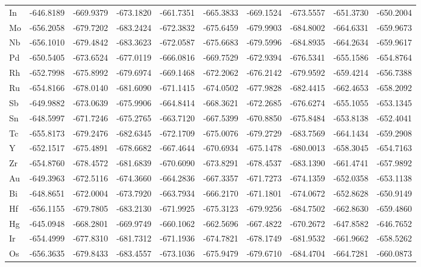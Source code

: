 \begin{table}[h]
{\begin{tabular}{*{10}{l}}
    In & -646.8189 & -669.9379 & -673.1820 & -661.7351 & -665.3833 & -669.1524 & -673.5557 & -651.3730 & -650.2004 \\
    Mo & -656.2058 & -679.7202 & -683.2424 & -672.3832 & -675.6459 & -679.9903 & -684.8002 & -664.6331 & -659.9673 \\
    Nb & -656.1010 & -679.4842 & -683.3623 & -672.0587 & -675.6683 & -679.5996 & -684.8935 & -664.2634 & -659.9617 \\
    Pd & -650.5405 & -673.6524 & -677.0119 & -666.0816 & -669.7529 & -672.9394 & -676.5341 & -655.1586 & -654.8764 \\
    Rh & -652.7998 & -675.8992 & -679.6974 & -669.1468 & -672.2062 & -676.2142 & -679.9592 & -659.4214 & -656.7388 \\
    Ru & -654.8166 & -678.0140 & -681.6090 & -671.1415 & -674.0502 & -677.9828 & -682.4415 & -662.4653 & -658.2092 \\
    Sb & -649.9882 & -673.0639 & -675.9906 & -664.8414 & -668.3621 & -672.2685 & -676.6274 & -655.1055 & -653.1345 \\
    Sn & -648.5997 & -671.7246 & -675.2765 & -663.7120 & -667.5399 & -670.8850 & -675.8484 & -653.8138 & -652.4041 \\
    Tc & -655.8173 & -679.2476 & -682.6345 & -672.1709 & -675.0076 & -679.2729 & -683.7569 & -664.1434 & -659.2908 \\
    Y  & -652.1517 & -675.4891 & -678.6682 & -667.4644 & -670.6934 & -675.1478 & -680.0013 & -658.3045 & -654.7163 \\
    Zr & -654.8760 & -678.4572 & -681.6839 & -670.6090 & -673.8291 & -678.4537 & -683.1390 & -661.4741 & -657.9892 \\
    Au & -649.3963 & -672.5116 & -674.3660 & -664.2836 & -667.3357 & -671.7273 & -674.1359 & -652.0358 & -653.1138 \\
    Bi & -648.8651 & -672.0004 & -673.7920 & -663.7934 & -666.2170 & -671.1801 & -674.0672 & -652.8628 & -650.9149 \\
    Hf & -656.1155 & -679.7805 & -683.2130 & -671.9925 & -675.3123 & -679.9256 & -684.7502 & -662.8630 & -659.4860 \\
    Hg & -645.0948 & -668.2801 & -669.9749 & -660.1062 & -662.5696 & -667.4822 & -670.2672 & -647.8582 & -646.7652 \\
    Ir & -654.4999 & -677.8310 & -681.7312 & -671.1936 & -674.7821 & -678.1749 & -681.9532 & -661.9662 & -658.5262 \\
    Os & -656.3635 & -679.8433 & -683.4557 & -673.1036 & -675.9479 & -679.6710 & -684.4704 & -664.7281 & -660.0873 \\

\end{tabular}}
\end{table}
